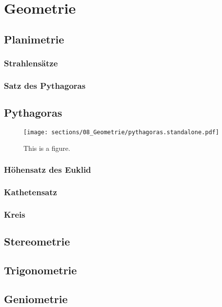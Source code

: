 \section{Geometrie}
\subsection{Planimetrie}
\subsubsection{Strahlensätze}
\subsubsection{Satz des Pythagoras}

\subsection{Pythagoras}


\begin{figure}[htb]
\begin{center}
	\texttt{[image: sections/08\_Geometrie/pythagoras.standalone.pdf]}
\caption{This is a figure.}
\end{center}
\end{figure}






\subsubsection{Höhensatz des Euklid}
\subsubsection{Kathetensatz}

\subsubsection{Kreis}


\subsection{Stereometrie}
\subsection{Trigonometrie}
\subsection{Geniometrie}